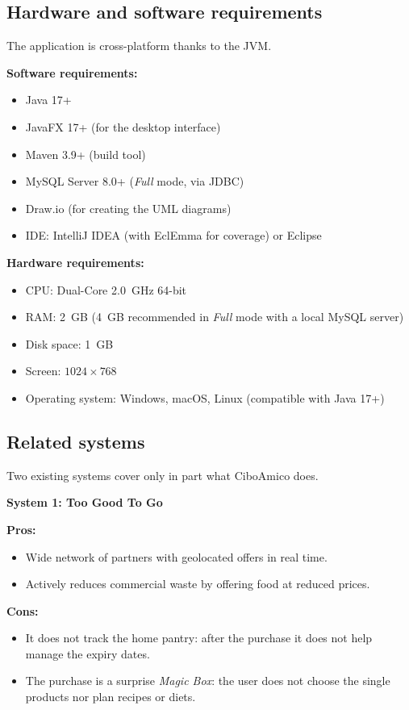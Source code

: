 \subsection{Hardware and software requirements}
\label{subsec:requisiti_hw_sw}

The application is cross-platform thanks to the JVM.

\textbf{Software requirements:}
\begin{itemize}
    \item Java 17+
    \item JavaFX 17+ (for the desktop interface)
    \item Maven 3.9+ (build tool)
    \item MySQL Server 8.0+ (\textit{Full} mode, via JDBC)
    \item Draw.io (for creating the UML diagrams)
    \item IDE: IntelliJ IDEA (with EclEmma for coverage) or Eclipse
\end{itemize}

\textbf{Hardware requirements:}
\begin{itemize}
    \item CPU: Dual-Core 2.0~GHz 64-bit
    \item RAM: 2~GB (4~GB recommended in \textit{Full} mode with a local MySQL server)
    \item Disk space: 1~GB
    \item Screen: $1024\times768$
    \item Operating system: Windows, macOS, Linux (compatible with Java 17+)
\end{itemize}

\subsection{Related systems}
\label{subsec:relazionati}

Two existing systems cover only in part what CiboAmico does.

\textbf{System 1: Too Good To Go}

\textbf{Pros:}
\begin{itemize}
    \item Wide network of partners with geolocated offers in real time.
    \item Actively reduces commercial waste by offering food at reduced prices.
\end{itemize}

\textbf{Cons:}
\begin{itemize}
    \item It does not track the home pantry: after the purchase it does not help manage the expiry dates.
    \item The purchase is a surprise \emph{Magic Box}: the user does not choose the single products nor plan recipes or diets.
\end{itemize}

